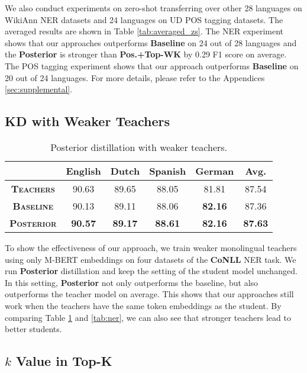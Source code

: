 \documentclass[11pt,a4paper]{article}
\begin{document}
We also conduct experiments on zero-shot transferring over other 28 languages on WikiAnn NER datasets and 24 languages on UD POS tagging datasets. The averaged results are shown in Table \ref{tab:averaged_zs}. The NER experiment shows that our approaches outperforms \textbf{Baseline} on 24 out of 28 languages and the \textbf{Posterior} is stronger than \textbf{Pos.+Top-WK} by 0.29 F1 score on average. The POS tagging experiment shows that our approach outperforms \textbf{Baseline} on 20 out of 24 languages. For more details, please refer to the Appendices \ref{sec:supplemental}. 

\subsection{KD with Weaker Teachers}

\begin{table}[t]
\setlength\tabcolsep{2.5pt}
\centering
\small
\begin{tabular}{c|cccc|c}
\hline\hline
 &\bf English & \bf Dutch    & \bf Spanish    & \bf German    & \bf Avg.\\
\hline
\bf\textsc{Teachers} & 90.63 & 89.65 & 88.05 & 81.81 & 87.54 \\
\hline
\bf\textsc{Baseline}      & 90.13 & 89.11 & 88.06 & \textbf{82.16} & 87.36 \\
\bf\textsc{Posterior} & \textbf{90.57} & \textbf{89.17} & \textbf{88.61} & \textbf{82.16} & \textbf{87.63} \\
\hline\hline
\end{tabular}
\caption{Posterior distillation with weaker teachers.}
\label{tab:M-BERT_posterior}
\end{table}

To show the effectiveness of our approach, we train weaker monolingual teachers using only M-BERT embeddings on four datasets of the \textbf{CoNLL} NER task. We run \textbf{Posterior} distillation and keep the setting of the student model unchanged. In this setting, \textbf{Posterior} not only outperforms the baseline, but also outperforms the teacher model on average. This shows that our approaches still work when the teachers have the same token embeddings as the student. By comparing Table \ref{tab:M-BERT_posterior} and \ref{tab:ner}, we can also see that stronger teachers lead to better students.


\subsection{$k$ Value in Top-K}
\end{document}

